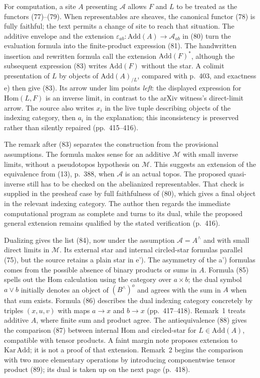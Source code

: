 For computation, a site $A$ presenting $\mathcal A$ allows $F$ and $L$ to be treated as the functors (77)--(79). When representables are sheaves, the canonical functor (78) is fully faithful; the text permits a change of site to reach that situation. The additive envelope and the extension $\varepsilon_{ab}:\mathrm{Add}(A)\to\mathcal A_{ab}$ in (80) turn the evaluation formula into the finite-product expression (81). The handwritten insertion and rewritten formula call the extension $\mathrm{Add}(F)^*$, although the subsequent expression (83) writes $\mathrm{Add}(F)$ without the star. A colimit presentation of $L$ by objects of $\mathrm{Add}(A)_{/L}$, compared with p.\ 403, and exactness e) then give (83). Its arrow under lim points \emph{left}: the displayed expression for $\mathrm{Hom}(L,F)$ is an inverse limit, in contrast to the arXiv witness's direct-limit arrow. The source also writes $x_i$ in the live tuple describing objects of the indexing category, then $a_i$ in the explanation; this inconsistency is preserved rather than silently repaired (pp.\ 415--416).

The remark after (83) separates the construction from the provisional assumptions. The formula makes sense for an additive $\mathcal M$ with small inverse limits, without a pseudotopos hypothesis on $\mathcal M$. This suggests an extension of the equivalence from (13), p.\ 388, when $\mathcal A$ is an actual topos. The proposed quasi-inverse still has to be checked on the abelianized representables. That check is supplied in the presheaf case by full faithfulness of (80), which gives a final object in the relevant indexing category. The author then regards the immediate computational program as complete and turns to its dual, while the proposed general extension remains qualified by the stated verification (p.\ 416).

Dualizing gives the list (84), now under the assumption $\mathcal A=A^\wedge$ and with small direct limits in $\mathcal M$. Its external star and internal circled-star formulas parallel (75), but the source retains a plain star in e'). The asymmetry of the a') formulas comes from the possible absence of binary products or sums in $A$. Formula (85) spells out the Hom calculation using the category over $a\times b$; the dual symbol $a\vee b$ initially denotes an object of $(B^\wedge)^o$ and agrees with the sum in $A$ when that sum exists. Formula (86) describes the dual indexing category concretely by triples $(x,u,v)$ with maps $a\to x$ and $b\to x$ (pp.\ 417--418). Remark~1 treats additive $A$, where finite sum and product agree. The antiequivalence (88) gives the comparison (87) between internal Hom and circled-star for $L\in\mathrm{Add}(A)$, compatible with tensor products. A faint margin note proposes extension to $\mathrm{Kar}\,\mathrm{Add}$; it is not a proof of that extension. Remark~2 begins the comparison with two more elementary operations by introducing componentwise tensor product (89); its dual is taken up on the next page (p.\ 418).

